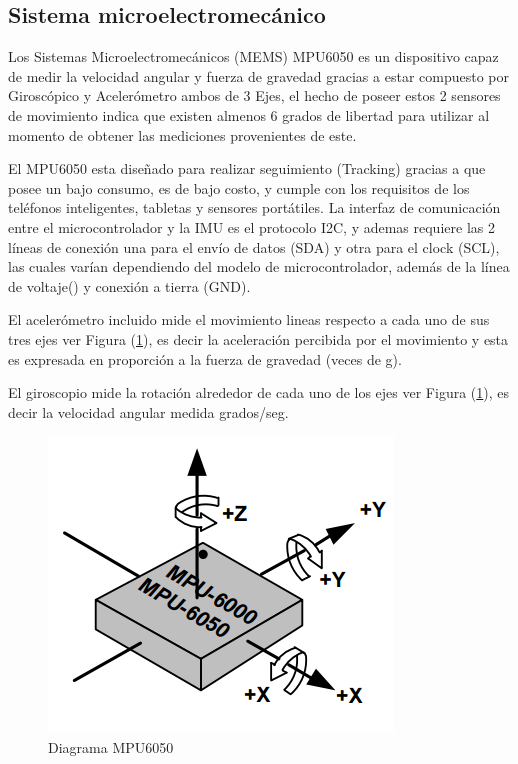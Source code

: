 \documentclass[12pt,a4paper]{article}
\begin{document}
\subsection{Sistema microelectromecánico}
Los Sistemas Microelectromecánicos (MEMS) MPU6050\cite{MPU6050} es un dispositivo capaz de medir la velocidad angular y fuerza de gravedad gracias a estar compuesto por Giroscópico y Acelerómetro ambos de 3 Ejes, el hecho de poseer estos 2 sensores de movimiento indica que existen almenos 6 grados de libertad para utilizar al momento de obtener las mediciones provenientes de este.
    
 El MPU6050 esta diseñado para realizar seguimiento (Tracking) gracias a que posee un bajo consumo, es de bajo costo, y cumple con los requisitos de los teléfonos inteligentes, tabletas y sensores portátiles.
 La interfaz de comunicación entre el microcontrolador y la IMU es el protocolo I2C, y ademas requiere las 2 líneas de conexión una para el envío de datos (SDA) y otra para el clock (SCL), las cuales varían dependiendo del modelo de microcontrolador, además de la línea de voltaje() y conexión a tierra (GND).

El acelerómetro incluido mide el movimiento lineas respecto a cada uno de sus tres ejes ver Figura (\ref{fig:MPU6050}), es decir la aceleración percibida por el movimiento y esta es expresada en proporción a la fuerza de gravedad (veces de g).

El giroscopio mide la rotación alrededor de cada uno de los ejes ver Figura (\ref{fig:MPU6050}), es decir la velocidad angular medida grados/seg.
\begin{figure}[H]
  \centering
  \includegraphics[scale=0.5]{images/MPU6050}
  \caption{Diagrama MPU6050}
  \label{fig:MPU6050}
\end{figure}
\end{document}
